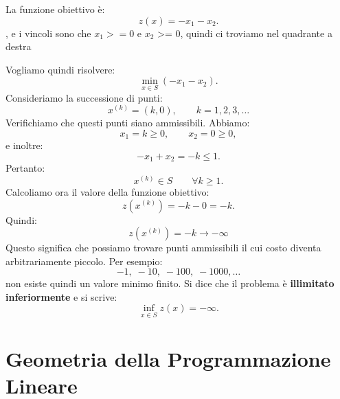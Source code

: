 La funzione obiettivo è: \[ z(x)=-x_1-x_2. \], e i vincoli sono che $x_1 >= 0$ e $x_2$ >= 0, quindi ci troviamo nel quadrante a destra


Vogliamo quindi risolvere: \[ \min_{x\in S}(-x_1-x_2). \] Consideriamo la successione di punti: \[ x^{(k)}=(k,0), \qquad k=1,2,3,\ldots \] Verifichiamo che questi punti siano ammissibili. Abbiamo: \[ x_1=k\geq0, \qquad x_2=0\geq0, \] e inoltre: \[ -x_1+x_2=-k\leq1. \] Pertanto: \[ x^{(k)}\in S \qquad\forall k\geq1. \] Calcoliamo ora il valore della funzione obiettivo: \[ z(x^{(k)}) = -k-0 = -k. \] Quindi: \[ \boxed{ z(x^{(k)})=-k\longrightarrow-\infty } \] Questo significa che possiamo trovare punti ammissibili il cui costo diventa arbitrariamente piccolo. Per esempio: \[ -1,\;-10,\;-100,\;-1000,\ldots \] non esiste quindi un valore minimo finito. Si dice che il problema è \textbf{illimitato inferiormente} e si scrive: \[ \boxed{ \inf_{x\in S}z(x)=-\infty. } \]




\section{Geometria della Programmazione Lineare}
